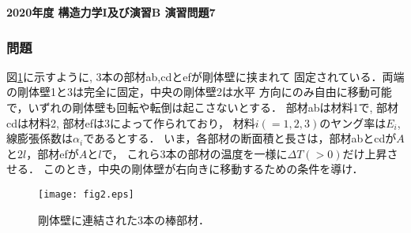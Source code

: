 \documentclass[10pt,a4j]{jarticle}
\newlength{\minitwocolumn}
\begin{document}
\newcommand{\fat}[1]{\mbox{\boldmath $#1$}}
\newcommand{\D}{\partial}
\newcommand{\w}{\omega}
\newcommand{\ga}{\alpha}
\newcommand{\gb}{\beta}
\newcommand{\gx}{\xi}
\newcommand{\gz}{\zeta}
\newcommand{\vhat}[1]{\hat{\fat{#1}}}
\newcommand{\spc}{\vspace{0.7\baselineskip}}
\newcommand{\halfspc}{\vspace{0.3\baselineskip}}

\pagestyle{empty}
\newcommand{\twofig}[2]
 {
   \begin{figure}[h]
     \begin{minipage}[t]{\minitwocolumn}
         \begin{center}   #1
         \end{center}
     \end{minipage}
         \hspace{\columnsep}
     \begin{minipage}[t]{\minitwocolumn}
         \begin{center} #2
         \end{center}
     \end{minipage}
   \end{figure}
 }
\begin{center}
{\Large \bf 2020年度 構造力学I及び演習B 演習問題7 } \\
\end{center}
\subsubsection*{問題}
図\ref{fig:fig2}に示すように, 3本の部材ab,cdとefが剛体壁に挟まれて
固定されている．両端の剛体壁1と3は完全に固定，中央の剛体壁2は水平
方向にのみ自由に移動可能で，いずれの剛体壁も回転や転倒は起こさないとする．
部材abは材料1で, 部材cdは材料2, 部材efは3によって作られており，
材料$i(=1,2,3)$のヤング率は$E_i$, 線膨張係数は$\alpha_i$であるとする．
いま，各部材の断面積と長さは，部材abとcdが$A$と$2l$，部材efが$A$と$l$で，
これら3本の部材の温度を一様に$\Delta T(>0)$だけ上昇させる．
このとき，中央の剛体壁が右向きに移動するための条件を導け．
\begin{figure}[h]
	\begin{center}
	\texttt{[image: fig2.eps]} 
	\end{center}
	\caption{剛体壁に連結された3本の棒部材．} 
	\label{fig:fig2}
\end{figure}
\end{document}
